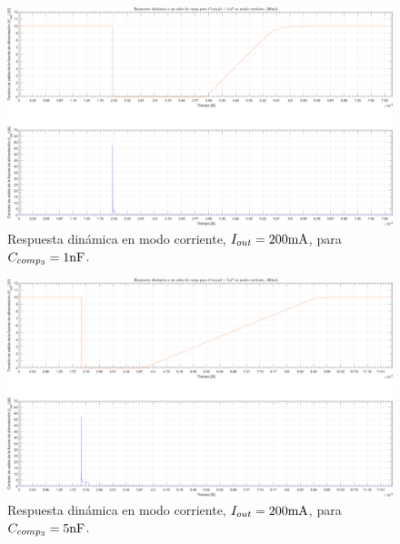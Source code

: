 \clearpage

\begin{figure}[H] %
\begin{center}
\includegraphics[width=1.1 \textwidth, angle=90]{./img/plots/dynamic/power_supply_CCOMP3_1n_STEP_Modo4.png}
\caption{\label{fig:fig_power_supply_CCOMP3_STEP_1n_Modo4}\footnotesize{Respuesta dinámica en modo corriente, $I_{out} = 200 \si[per-mode=symbol]{\milli\ampere}$, para $C_{comp_{3}} = 1 \si[per-mode=symbol]{\nano\farad} $.}}
\end{center}
\end{figure}

\clearpage

\begin{figure}[H] %
\begin{center}
\includegraphics[width=1.1 \textwidth, angle=90]{./img/plots/dynamic/power_supply_CCOMP3_5n_STEP_Modo4.png}
\caption{\label{fig:fig_power_supply_CCOMP3_STEP_5n_Modo4}\footnotesize{Respuesta dinámica en modo corriente, $I_{out} = 200 \si[per-mode=symbol]{\milli\ampere}$, para $C_{comp_{3}} = 5 \si[per-mode=symbol]{\nano\farad} $.}}
\end{center}
\end{figure}

\clearpage




